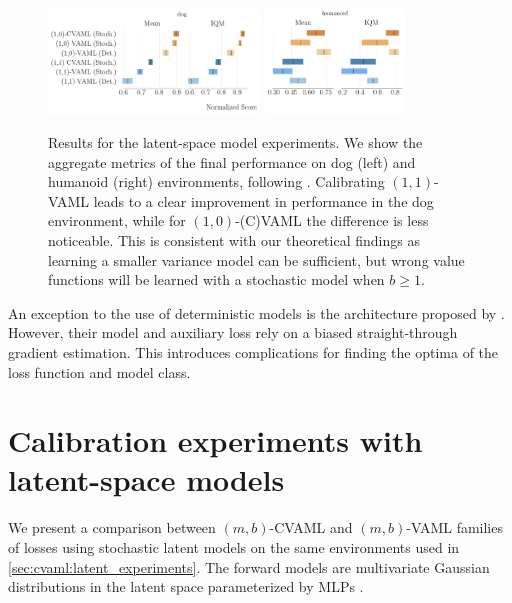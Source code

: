 \begin{figure}[t]
\centering
   \includegraphics[width=0.5\textwidth]{figures/lambda/plts/agg_dog.pdf} 
   \includegraphics[width=0.33\textwidth]{figures/lambda/plts/agg_hum.pdf} 
   \caption{Results for the latent-space model experiments. We show the aggregate metrics of the final performance on dog (left) and humanoid (right) environments, following \cite{agarwal2021deep}. Calibrating $(1,1)$-VAML leads to a clear improvement in performance in the dog environment, while for $(1,0)$-(C)VAML the difference is less noticeable. This is consistent with our theoretical findings as learning a smaller variance model can be sufficient, but wrong value functions will be learned with a stochastic model when $b\geq1$.}
   \label{fig:cvaml:agg_results}
\end{figure}

An exception to the use of deterministic models is the architecture proposed by \textcite{antonoglou2022planning}.
However, their model and auxiliary loss rely on a biased straight-through gradient estimation.
This introduces complications for finding the optima of the loss function and model class.

\section{Calibration experiments with latent-space models}
\label{sec:cvaml:empirical2}

We present a comparison between $(m,b)$-CVAML and $(m,b)$-VAML families of losses using stochastic latent models on the same environments used in \autoref{sec:cvaml:latent_experiments}.
The forward models are multivariate Gaussian distributions in the latent space parameterized by MLPs \cite{pets,mbpo,paster2021blast}. 
 
